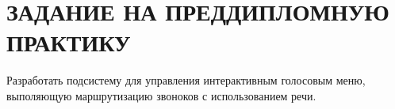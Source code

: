 \chapter{ЗАДАНИЕ НА ПРЕДДИПЛОМНУЮ ПРАКТИКУ}

Разработать подсистему для управления интерактивным голосовым меню,
выполяющую маршрутизацию звоноков с использованием речи.
